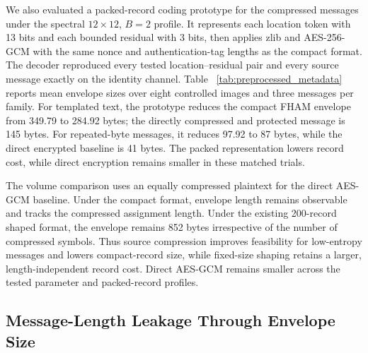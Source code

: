 \documentclass[preprint,12pt]{elsarticle}
\theoremstyle{plain}
\begin{document}
\begin{table}[!t]
\centering
\small
\caption{Compact record size for the controlled 200-character cohort under $B=2$ with an uncompressed source message.}
\label{tab:channel_bounded}

\end{table}

We also evaluated a packed-record coding prototype for the compressed
messages under the spectral $12\times12$, $B=2$ profile. It represents each
location token with 13 bits and each bounded residual with 3 bits, then applies
zlib and AES-256-GCM with the same nonce and authentication-tag lengths as the
compact format. The decoder reproduced every tested location--residual pair
and every source message exactly on the identity channel. Table
~\ref{tab:preprocessed_metadata} reports mean envelope sizes over eight
controlled images and three messages per family. For templated text, the
prototype reduces the compact FHAM envelope from 349.79 to 284.92 bytes; the
directly compressed and protected message is 145 bytes. For repeated-byte
messages, it reduces 97.92 to 87 bytes, while the direct encrypted baseline is
41 bytes. The packed representation lowers record cost, while direct
encryption remains smaller in these matched trials.

\begin{table}[!t]
\centering
\small
\caption{Protected Metadata after Lossless Message Compression (Bytes)}
\label{tab:preprocessed_metadata}
\resizebox{\linewidth}{!}{}
\end{table}

The volume comparison uses an equally compressed plaintext for the direct
AES-GCM baseline. Under the compact format, envelope length remains observable
and tracks the compressed assignment length. Under the existing 200-record
shaped format, the envelope remains 852 bytes irrespective of the number of
compressed symbols. Thus source compression improves feasibility for
low-entropy messages and lowers compact-record size, while fixed-size shaping
retains a larger, length-independent record cost. Direct AES-GCM remains
smaller across the tested parameter and packed-record profiles.

\subsection{Message-Length Leakage Through Envelope Size}
\end{document}
